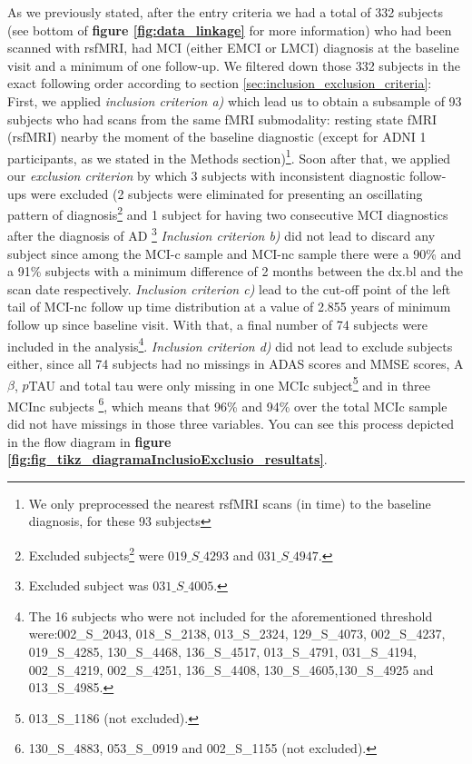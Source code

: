 \documentclass[a4paper,12pt]{elsarticle}  %
\begin{document}
		As we previously stated, after the entry criteria we had a total of 332 subjects (see bottom of \textbf{figure \ref{fig:data_linkage}} for more information) who had been scanned with rsfMRI, had MCI (either EMCI or LMCI) diagnosis at the baseline visit and a minimum of one follow-up. We filtered down those 332 subjects in the exact following order according to section \ref{sec:inclusion_exclusion_criteria}: First, we applied \textit{inclusion criterion a)} which lead us to obtain a subsample of 93 subjects who had scans from the same fMRI submodality: resting state fMRI (rsfMRI) nearby the moment of the baseline diagnostic (except for ADNI 1 participants, as we stated in the Methods section)\footnote{We only preprocessed the nearest rsfMRI scans (in time) to the baseline diagnosis, for these 93 subjects}. Soon after that, we applied our \textit{exclusion criterion} by which 3 subjects with inconsistent diagnostic follow-ups were excluded (2 subjects were eliminated for presenting an oscillating pattern of diagnosis\footnote{Excluded subjects\footnote{(see exclusion criterion definition \ref{sec:inclusion_exclusion_criteria} to find a definition on inconsistency).} were $019\_S\_4293$ and $031\_S \_ 4947$.} and 1 subject for having two consecutive MCI diagnostics after the diagnosis of AD \footnote{Excluded subject was $031\_S\_4005$.} \textit{Inclusion criterion b)} did not lead to discard any subject since among the MCI-c sample and MCI-nc sample there were a 90\% and a 91\% subjects with a minimum difference of 2 months between the dx.bl and the scan date respectively. \textit{Inclusion criterion c)} lead to the cut-off point of the left tail of MCI-nc follow up time distribution at a value of 2.855 years of minimum follow up since baseline visit. With that, a final number of 74 subjects were included in the analysis\footnote{The 16 subjects who were not included for the aforementioned threshold were:002\_S\_2043, 018\_S\_2138, 013\_S\_2324, 129\_S\_4073, 002\_S\_4237, 019\_S\_4285, 130\_S\_4468, 136\_S\_4517, 013\_S\_4791, 031\_S\_4194, 002\_S\_4219, 002\_S\_4251, 136\_S\_4408, 130\_S\_4605,130\_S\_4925 and 013\_S\_4985.}. \textit{Inclusion criterion d)} did not lead to exclude subjects either, since all 74 subjects had no missings in ADAS scores and MMSE scores, A$\beta$, $p$TAU and total tau were only missing in one MCIc subject\footnote{013\_S\_1186 (not excluded).
		} and in three MCInc subjects \footnote{130\_S\_4883, 053\_S\_0919 and 002\_S\_1155 (not excluded).}, which means that 96\% and 94\% over the total MCIc sample did not have missings in those three variables. You can see this process depicted in the flow diagram in \textbf{figure \ref{fig:fig_tikz_diagramaInclusioExclusio_resultats}}.
	
\end{document}
